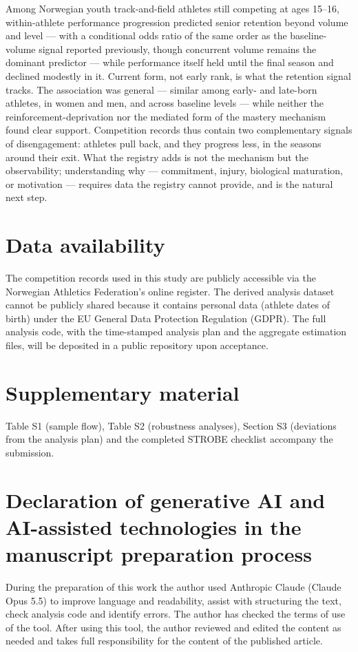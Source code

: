 \documentclass[12pt,a4paper]{article}
\begin{document}
Among Norwegian youth track-and-field athletes still competing at ages 15--16, within-athlete performance progression predicted senior retention beyond volume and level --- with a conditional odds ratio of the same order as the baseline-volume signal reported previously, though concurrent volume remains the dominant predictor --- while performance itself held until the final season and declined modestly in it. Current form, not early rank, is what the retention signal tracks. The association was general --- similar among early- and late-born athletes, in women and men, and across baseline levels --- while neither the reinforcement-deprivation nor the mediated form of the mastery mechanism found clear support. Competition records thus contain two complementary signals of disengagement: athletes pull back, and they progress less, in the seasons around their exit. What the registry adds is not the mechanism but the observability; understanding why --- commitment, injury, biological maturation, or motivation --- requires data the registry cannot provide, and is the natural next step.




\section*{Data availability}

\noindent The competition records used in this study are publicly accessible via the Norwegian Athletics Federation's online register. The derived analysis dataset cannot be publicly shared because it contains personal data (athlete dates of birth) under the EU General Data Protection Regulation (GDPR). The full analysis code, with the time-stamped analysis plan and the aggregate estimation files, will be deposited in a public repository upon acceptance.

\section*{Supplementary material}

\noindent Table S1 (sample flow), Table S2 (robustness analyses), Section S3 (deviations from the analysis plan) and the completed STROBE checklist accompany the submission.

\section*{Declaration of generative AI and AI-assisted technologies in the manuscript preparation process}

\noindent During the preparation of this work the author used Anthropic Claude (Claude Opus 5.5) to improve language and readability, assist with structuring the text, check analysis code and identify errors. The author has checked the terms of use of the tool. After using this tool, the author reviewed and edited the content as needed and takes full responsibility for the content of the published article.

\printbibliography
\end{document}
